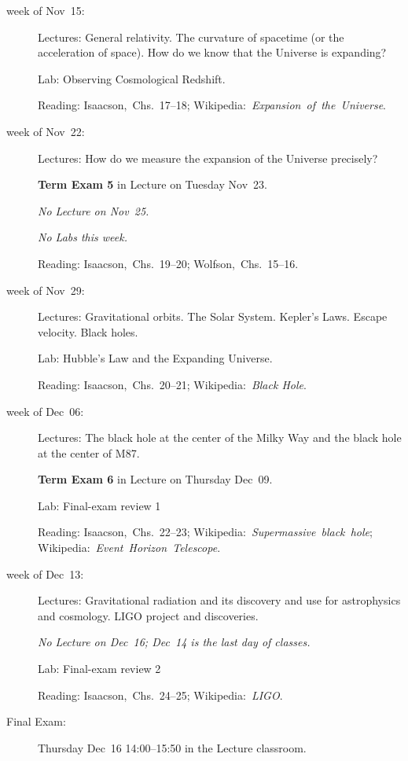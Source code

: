\documentclass[12pt, letterpaper]{article}
\begin{document}
\begin{description}
\item[week of Nov~15:] Lectures: General relativity. The curvature of
  spacetime (or the acceleration of space). How do we know that the Universe
  is expanding? 

  Lab: Observing Cosmological Redshift.

  Reading: Isaacson,~Chs.~17--18;
  Wikipedia:~\textit{Expansion~of~the~Universe}.

\item[week of Nov~22:] Lectures:
  How do we measure the expansion of the Universe precisely?

  \textbf{Term Exam 5} in Lecture on Tuesday Nov~23.

  \textsl{No Lecture on Nov~25.}

  \textsl{No Labs this week.}

  Reading: Isaacson,~Chs.~19--20;
           Wolfson,~Chs.~15--16.

\item[week of Nov~29:] Lectures: Gravitational orbits. The Solar System. Kepler's
  Laws. Escape velocity. Black holes.

  Lab: Hubble's Law and the Expanding Universe.

  Reading: Isaacson,~Chs.~20--21;
  Wikipedia:~\textit{Black Hole}.

\item[week of Dec~06:] Lectures: The black hole at the center of the
  Milky Way and the black hole at the center of M87.

  \textbf{Term Exam 6} in Lecture on Thursday Dec~09.

  Lab: Final-exam review 1

  Reading: Isaacson,~Chs.~22--23;
  Wikipedia:~\textit{Supermassive~black~hole};
  Wikipedia:~\textit{Event~Horizon~Telescope}.

\item[week of Dec~13:] Lectures: Gravitational radiation and its
  discovery and use for astrophysics and cosmology. LIGO project and
  discoveries.

  \textsl{No Lecture on Dec~16; Dec~14 is the last day of classes.}
  
  Lab: Final-exam review 2

  Reading: Isaacson,~Chs.~24--25;
  Wikipedia:~\textit{LIGO}.

\item[Final Exam:] Thursday Dec~16 14:00--15:50 in the Lecture classroom.
\end{description}
\end{document}
